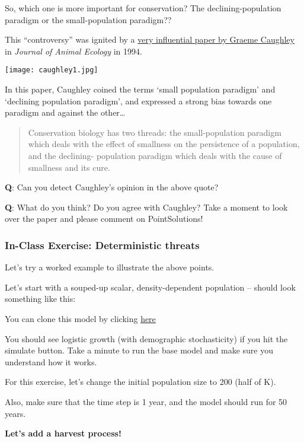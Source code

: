 \documentclass[
]{article}
\begin{document}
So, which one is more important for conservation? The
declining-population paradigm or the small-population paradigm??

This ``controversy'' was ignited by a \href{caughley1.pdf}{very
influential paper by Graeme Caughley} in \emph{Journal of Animal
Ecology} in 1994.

\texttt{[image: caughley1.jpg]}

In this paper, Caughley coined the terms `small population paradigm' and
`declining population paradigm', and expressed a strong bias towards one
paradigm and against the other\ldots{}

\begin{quote}
Conservation biology has two threads: the small-population paradigm
which deals with the effect of smallness on the persistence of a
population, and the declining- population paradigm which deals with the
cause of smallness and its cure.
\end{quote}

\textbf{Q}: Can you detect Caughley's opinion in the above quote?

\textbf{Q}: What do you think? Do you agree with Caughley? Take a moment
to look over the paper and please comment on PointSolutions!

\hypertarget{in-class-exercise-deterministic-threats}{%
\subsubsection{In-Class Exercise: Deterministic
threats}\label{in-class-exercise-deterministic-threats}}

Let's try a worked example to illustrate the above points.

Let's start with a souped-up scalar, density-dependent population --
should look something like this:

You can clone this model by clicking
\href{https://insightmaker.com/insight/74417/declining-population-paradigm}{here}

You should see logistic growth (with demographic stochasticity) if you
hit the simulate button. Take a minute to run the base model and make
sure you understand how it works.

For this exercise, let's change the initial population size to 200 (half
of K).

Also, make sure that the time step is 1 year, and the model should run
for 50 years.

\textbf{Let's add a harvest process!}
\end{document}
